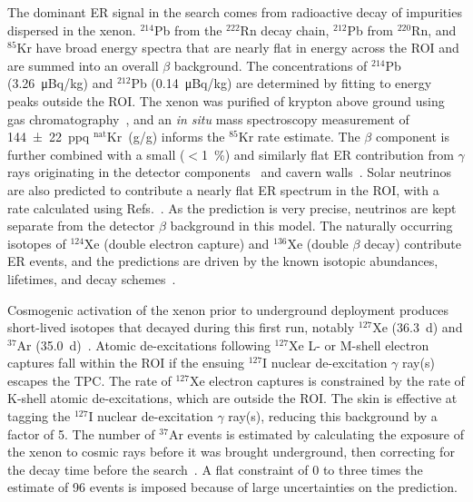 The dominant ER signal in the search comes from radioactive decay of impurities dispersed in the xenon. $^{214}$Pb from the $^{222}$Rn decay chain, $^{212}$Pb from $^{220}$Rn, and $^{85}$Kr have broad energy spectra that are nearly flat in energy across the ROI and are summed into an overall $\beta$ background. The concentrations of $^{214}$Pb (\SI{3.26}{\micro Bq/kg}) and $^{212}$Pb (\SI{0.14}{\micro Bq/kg}) are determined by fitting to energy peaks outside the ROI. 
The xenon was purified of krypton above ground using gas chromatography~\cite{akerib2018chromatography}, and an \textit{in situ} mass spectroscopy measurement of \SI{144(22)}{ppq} $^{\mathrm{nat}}$Kr~(g/g) informs the $^{85}$Kr rate estimate. 
The $\beta$ component is further combined with a small ($<$\SI{1}{\percent}) and similarly flat ER contribution from $\gamma$ rays originating in the detector components~\cite{akerib2020cleanliness} and cavern walls~\cite{AKERIB2020102391}. Solar neutrinos are also predicted to contribute a nearly flat ER spectrum in the ROI, with a rate calculated using Refs.~\cite{baxter2021recommended, Agostini2019Simultaneous, vinyoles2017new, aharmin2013combined}. As the prediction is very precise, neutrinos are kept separate from the detector $\beta$ background in this model. The naturally occurring isotopes of $^{124}$Xe (double electron capture) and $^{136}$Xe (double $\beta$ decay) contribute ER events, and the predictions are driven by the known isotopic abundances, lifetimes, and decay schemes~\cite{BerglundWieserIso,aprile2019observation,PhysRevC.89.015502}. 

Cosmogenic activation of the xenon prior to underground deployment produces short-lived isotopes that decayed during this first run, notably $^{127}$Xe (\SI{36.3}{d}) and $^{37}$Ar (\SI{35.0}{d})~\cite{TabRad_v7,TabRad_v8, PhysRevD.96.112011}. Atomic de-excitations following $^{127}$Xe L- or M-shell electron captures fall within the ROI if the ensuing $^{127}$I nuclear de-excitation $\gamma$ ray(s) escapes the TPC.  The rate of $^{127}$Xe electron captures is constrained by the rate of K-shell atomic de-excitations, which are outside the ROI.  The skin is effective at tagging the $^{127}$I nuclear de-excitation $\gamma$ ray(s), reducing this background by a factor of 5. 
The number of $^{37}$Ar events is estimated by calculating the exposure of the xenon to cosmic rays before it was brought underground, then correcting for the decay time before the search~\cite{aalbers2022cosmogenic}. A flat constraint of 0 to three times the estimate of 96 events is imposed because of large uncertainties on the prediction.

